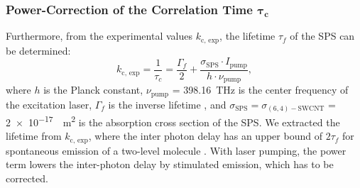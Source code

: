 \subsubsection{Power-Correction of the Correlation Time \texorpdfstring{$\boldsymbol{\tau_c}$}{tauc}}\label{sec:powercorr}
Furthermore, from the experimental values $k_\mathrm{c,\, exp}$, the lifetime $\tau_f$ of the \ac{SPS} can be determined:
\begin{equation}\label{eq:taufpump}
	k_\mathrm{c,\, exp}=\frac{1}{\tau_c}=\frac{\Gamma_f}{2}+\frac{\sigma_\mathrm{SPS}\cdot I_\mathrm{pump}}{h\cdot\nu_\mathrm{pump}},
\end{equation}
where $h$ is the Planck constant, $\nu_\mathrm{pump}$ = \SI{398.16}{\THz} is the center frequency of the excitation laser, $\Gamma_f$ is the inverse lifetime \cite{treussart_photon_2001}, and $\sigma_\mathrm{SPS}=\sigma_\mathrm{(6,4)-SWCNT}$ = \SI{2e-17}{\per\m\squared} is the absorption cross section of the \ac{SPS}. 
We extracted the lifetime from $k_\mathrm{c,\, exp}$, where the inter photon delay has an upper bound of $2\tau_f$ for spontaneous emission of a two-level molecule \cite{maser_few-photon_2017}. With laser pumping, the power term lowers the inter-photon delay by stimulated emission, which has to be corrected.

